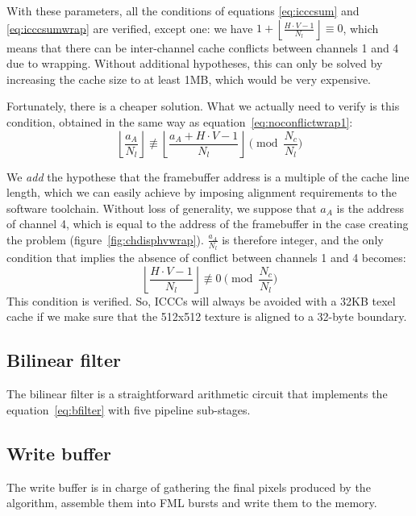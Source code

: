 \documentclass[a4paper,11pt]{kthesis}
\begin{document}
With these parameters, all the conditions of equations \ref{eq:icccsum} and \ref{eq:icccsumwrap} are verified, except one: we have $1 + \left\lfloor \frac{H \cdot V - 1}{N_{l}} \right\rfloor \equiv 0$, which means that there can be inter-channel cache conflicts between channels 1 and 4 due to wrapping. Without additional hypotheses, this can only be solved by increasing the cache size to at least 1MB, which would be very expensive.

Fortunately, there is a cheaper solution. What we actually need to verify is this condition, obtained in the same way as equation~\ref{eq:noconflictwrap1}:
\begin{equation}
\left\lfloor \frac{a_{A}}{N_{l}} \right\rfloor \not \equiv \left\lfloor \frac{a_{A}+H \cdot V-1}{N_{l}} \right\rfloor \pmod{\frac{N_{c}}{N_{l}}}
\end{equation}

We \textit{add} the hypothese that the framebuffer address is a multiple of the cache line length, which we can easily achieve by imposing alignment requirements to the software toolchain. Without loss of generality, we suppose that $a_{A}$ is the address of channel 4, which is equal to the address of the framebuffer in the case creating the problem (figure~\ref{fig:chdisphvwrap}). $\frac{a_{A}}{N_{l}}$ is therefore integer, and the only condition that implies the absence of conflict between channels 1 and 4 becomes:
\begin{equation}
\left\lfloor \frac{H \cdot V-1}{N_{l}} \right\rfloor \not \equiv 0 \pmod{\frac{N_{c}}{N_{l}}}
\end{equation}
This condition is verified. So, ICCCs will always be avoided with a 32KB texel cache if we make sure that the 512x512 texture is aligned to a 32-byte boundary.

\subsection{Bilinear filter}
The bilinear filter is a straightforward arithmetic circuit that implements the equation~\ref{eq:bfilter} with five pipeline sub-stages.

\subsection{Write buffer}
The write buffer is in charge of gathering the final pixels produced by the algorithm, assemble them into FML bursts and write them to the memory.
\end{document}
